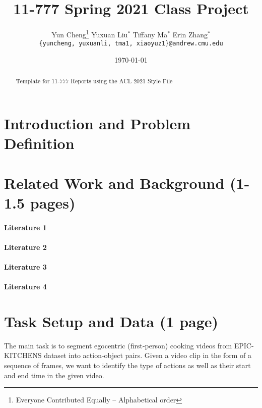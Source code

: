 \documentclass[11pt,a4paper]{article}
\title{11-777 Spring 2021 Class Project}
\author{
  Yun Cheng\thanks{\hspace{4pt}Everyone Contributed Equally -- Alphabetical order} \hspace{2em} Yuxuan Liu$^*$ \hspace{2em} Tiffany Ma$^*$ \hspace{2em} Erin Zhang$^*$ \\
  \texttt{\{yuncheng, yuxuanli, tma1, xiaoyuz1\}@andrew.cmu.edu}
}
\date{\today}
\begin{document}
\maketitle
\begin{abstract}
Template for 11-777 Reports using the ACL 2021 Style File 
\end{abstract}

\section{Introduction and Problem Definition}


\clearpage
\section{Related Work and Background (1-1.5 pages)}
\paragraph{Literature 1}
\paragraph{Literature 2}
\paragraph{Literature 3}
\paragraph{Literature 4}

\clearpage

\section{Task Setup and Data (1 page)}
The main task is to segment egocentric (first-person) cooking videos from EPIC-KITCHENS dataset into action-object pairs. Given a video clip in the form of a sequence of frames, we want to identify the type of actions as well as their start and end time in the given video.
\end{document}
